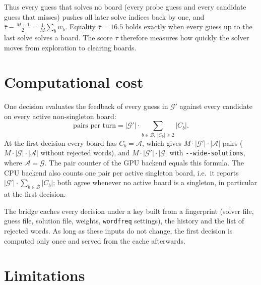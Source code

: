 \documentclass[11pt,a4paper]{article}
\theoremstyle{definition}
\theoremstyle{remark}
\newcommand{\G}{\mathcal{G}}
\newcommand{\A}{\mathcal{A}}
\newcommand{\B}{\mathcal{B}}
\begin{document}
Thus every guess that solves no board (every probe guess and every candidate guess that
misses) pushes all later solve indices back by one, and
$\bar\tau - \tfrac{M+1}{2} = \tfrac{1}{M}\sum_b w_b$.
Equality $\bar\tau = 16.5$ holds exactly when every guess up to the last solve solves a board.
The score $\bar\tau$ therefore measures how quickly the solver moves from
exploration to clearing boards.

\section{Computational cost}

One decision evaluates the feedback of every guess in $\G'$ against every candidate
on every active non-singleton board:
\[
  \text{pairs per turn} = |\G'| \cdot \sum_{b \in \B,\ |C_b| \ge 2} |C_b| .
\]
At the first decision every board has $C_b = \A$, which gives
$M \cdot |\G'| \cdot |\A|$ pairs ($M \cdot |\G| \cdot |\A|$ without rejected words), and
$M \cdot |\G'| \cdot |\G|$ with \texttt{-{}-wide-solutions}, where $\A = \G$.
The pair counter of the GPU backend equals this formula. The CPU backend also counts one
pair per active singleton board, i.e.\ it reports $|\G'| \cdot \sum_{b \in \B} |C_b|$;
both agree whenever no active board is a singleton, in particular at the first decision.

The bridge caches every decision under a key built from a fingerprint (solver file, guess
file, solution file, weights, \texttt{wordfreq} settings), the history and the list of
rejected words. As long as these inputs do not change, the first decision is computed only
once and served from the cache afterwards.

\section{Limitations}
\label{sec:limits}
\end{document}
